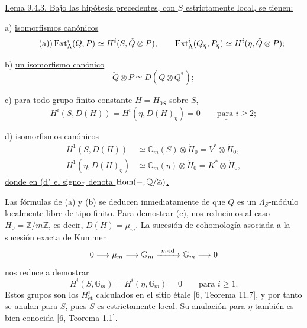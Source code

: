 
\medskip
\noindent
\underline{Lema 9.4.3. Bajo las hipótesis precedentes, con $S$
estrictamente local, se tienen:}

\smallskip
\noindent
a) \underline{isomorfismos canónicos}
\begin{equation*}\tag{a)}
 \operatorname{Ext}^i_\Lambda(Q,P)\simeq H^i(S,\check Q\otimes P),
 \qquad
 \operatorname{Ext}^i_\Lambda(Q_\eta,P_\eta)
 \simeq H^i(\eta,\check Q\otimes P);
\end{equation*}

\noindent
b) \underline{un isomorfismo canónico}
\begin{equation}\tag{b)}
 \check Q\otimes P\simeq D(Q\otimes Q^*);
\end{equation}

\noindent
c) \underline{para todo grupo finito constante $H=H_{0S}$ sobre $S$,}
\begin{equation}\tag{c)}
 H^i(S,D(H))=H^i(\eta,D(H)_\eta)=0
 \qquad\underline{\text{para }}i\geq2;
\end{equation}

\noindent
d) \underline{isomorfismos canónicos}
\begin{equation}\tag{d)}
\begin{aligned}
 H^1(S,D(H))&\simeq\mathbb G_m(S)\otimes\check H_0
               =V^*\otimes\check H_0,\\
 H^1(\eta,D(H)_\eta)&\simeq\mathbb G_m(\eta)\otimes\check H_0
               =K^*\otimes\check H_0,
\end{aligned}
\end{equation}
\underline{donde en (d) el signo $\check{\ }$ denota
$\operatorname{Hom}(-,\mathbb Q/\mathbb Z)$.}

Las fórmulas de (a) y (b) se deducen inmediatamente de que $Q$ es un
$\Lambda_S$-módulo localmente libre de tipo finito. Para demostrar (c),
nos reducimos al caso $H_0=\mathbb Z/m\mathbb Z$, es decir,
$D(H)=\mu_m$. La sucesión de cohomología asociada a la sucesión exacta
de Kummer
\begin{equation*}
 0\longrightarrow\mu_m\longrightarrow\mathbb G_m
 \xrightarrow{\ m\cdot\mathrm{id}\ }\mathbb G_m
 \longrightarrow0
\end{equation*}
nos reduce a demostrar
\begin{equation*}
 H^i(S,\mathbb G_m)=H^i(\eta,\mathbb G_m)=0
 \qquad\text{para }i\geq1.
\end{equation*}
Estos grupos son los $H^i_{\mathrm{\acute et}}$ calculados en el sitio
étale [6, Teorema 11.7], y por tanto se anulan para $S$, pues $S$ es
estrictamente local. Su anulación para $\eta$ también es bien conocida
[6, Teorema 1.1].


